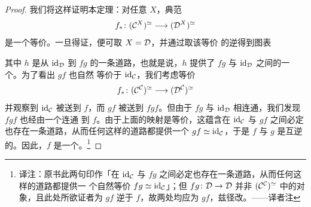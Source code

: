 \begin{proof}
我们将这样证明本定理：对任意\trSimplicialSet{} $X$，典范\trFunctor{}%
\[
f_*\colon (\mathcal{C}^X)^{\simeq} \longrightarrow (\mathcal{D}^X)^{\simeq}
\]
是一个\trHomotopy{}等价。一旦得证，便可取 $X = \mathcal{D}$，并通过取该\trHomotopy{}等价
的逆得到图表
\begin{center}
\end{center}
其中 $h$ 是从 $\mathrm{id}_{\mathcal{D}}$ 到 $fg$ 的一条道路，也就是说，$h$ 提供了 $fg$
与 $\mathrm{id}_{\mathcal{D}}$ 之间的一个\trNaturalEquivalence{}。为了看出 $gf$ 也自然
等价于 $\mathrm{id}_{\mathcal{C}}$，我们考虑\trHomotopy{}等价
\[
f_*\colon (\mathcal{C}^{\mathcal{C}})^{\simeq} \longrightarrow (\mathcal{D}^{\mathcal{C}})^{\simeq}
\]
并观察到 $\mathrm{id}_{\mathcal{C}}$ 被送到 $f$，而 $gf$ 被送到 $fgf$。但由于 $fg$ 与
$\mathrm{id}_{\mathcal{D}}$ 相连通，我们发现 $fgf$ 也经由一个\trNaturalEquivalence{}连通
到 $f$。由于上面的映射是\trHomotopy{}等价，这蕴含在 $\mathrm{id}_{\mathcal{C}}$ 与 $gf$
之间必定也存在一条道路，从而任何这样的道路都提供一个\trNaturalEquivalence{}%
$gf \simeq \mathrm{id}_{\mathcal{C}}$，于是 $f$ 与 $g$ 是互逆的\trFunctor{}。因此，$f$
是一个\trJoyalEquivalence{}。\footnote{译注：原书此两句印作「在
$\mathrm{id}_{\mathcal{C}}$ 与 $fg$ 之间必定也存在一条道路，从而任何这样的道路都提供一
个自然等价 $fg \simeq \mathrm{id}_{\mathcal{C}}$」；但 $fg\colon \mathcal{D} \to \mathcal{D}$ 并非
$(\mathcal{C}^{\mathcal{C}})^{\simeq}$ 中的对象，且此处所欲证者为 $gf$ 逆于 $f$，故两处均应为
$gf$，兹径改。——译者注}


\end{proof}
